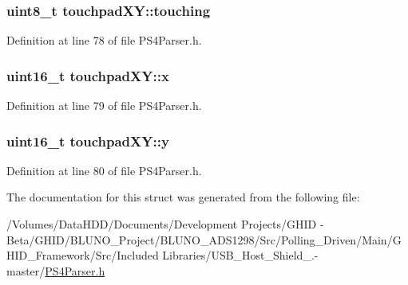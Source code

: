 \hypertarget{structtouchpad_x_y_a2c078e99c3b96303e6b6a60e2f36acc5}{
\subsubsection[{touching}]{\setlength{\rightskip}{0pt plus 5cm}uint8\-\_\-t {\bf touchpad\-X\-Y\-::touching}}}\label{structtouchpad_x_y_a2c078e99c3b96303e6b6a60e2f36acc5}


\-Definition at line 78 of file \-P\-S4\-Parser.\-h.

\hypertarget{structtouchpad_x_y_a1c38a3e4161b1495b4d8ce37124c72a5}{
\subsubsection[{x}]{\setlength{\rightskip}{0pt plus 5cm}uint16\-\_\-t {\bf touchpad\-X\-Y\-::x}}}\label{structtouchpad_x_y_a1c38a3e4161b1495b4d8ce37124c72a5}


\-Definition at line 79 of file \-P\-S4\-Parser.\-h.

\hypertarget{structtouchpad_x_y_ac4ceb26c0ebba1c5a2691a1ecdb7dbae}{
\subsubsection[{y}]{\setlength{\rightskip}{0pt plus 5cm}uint16\-\_\-t {\bf touchpad\-X\-Y\-::y}}}\label{structtouchpad_x_y_ac4ceb26c0ebba1c5a2691a1ecdb7dbae}


\-Definition at line 80 of file \-P\-S4\-Parser.\-h.



\-The documentation for this struct was generated from the following file\-:\begin{DoxyCompactItemize}
\item 
/\-Volumes/\-Data\-H\-D\-D/\-Documents/\-Development Projects/\-G\-H\-I\-D -\/ Beta/\-G\-H\-I\-D/\-B\-L\-U\-N\-O\-\_\-\-Project/\-B\-L\-U\-N\-O\-\_\-\-A\-D\-S1298/\-Src/\-Polling\-\_\-\-Driven/\-Main/\-G\-H\-I\-D\-\_\-\-Framework/\-Src/\-Included Libraries/\-U\-S\-B\-\_\-\-Host\-\_\-\-Shield\-\_.-\/master/\hyperlink{_p_s4_parser_8h}{\-P\-S4\-Parser.\-h}\end{DoxyCompactItemize}
